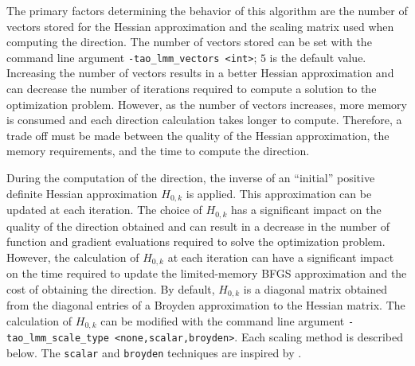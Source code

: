 The primary factors determining the behavior of this algorithm are the 
number of vectors stored for the Hessian approximation and the scaling matrix
used when computing the direction.  The number of vectors stored can be set
with the command line argument {\tt -tao\_lmm\_vectors <int>}; $5$ is the 
default 
value.  Increasing the number of vectors results in a better Hessian 
approximation and can decrease the number of iterations required to compute
a solution to the optimization problem.  However, as the number of vectors
increases, more memory is consumed and each direction calculation takes
longer to compute.  Therefore, a trade off must be made between the 
quality of the Hessian approximation, the memory requirements, and
the time to compute the direction.

During the computation of the direction, the inverse of an ``initial''
positive definite Hessian approximation $H_{0,k}$ is applied.  This 
approximation can be updated at each iteration.  The choice of $H_{0,k}$
has a significant impact on the quality of the direction obtained
and can result in a decrease in the number of function and gradient 
evaluations required to solve the optimization problem.  However,
the calculation of $H_{0,k}$ at each iteration can have a significant 
impact on the time required to update the limited-memory BFGS 
approximation and the cost of obtaining the direction.  By default, 
$H_{0,k}$ is a diagonal matrix obtained from the diagonal entries
of a Broyden approximation to the Hessian matrix.  The calculation
of $H_{0,k}$ can be modified with the command line argument 
{\tt -tao\_lmm\_scale\_type <none,scalar,broyden>}.  Each scaling 
method is described below.  The {\tt scalar} and {\tt broyden} 
techniques are inspired by \cite{Gilbert-Lemarechal}.

